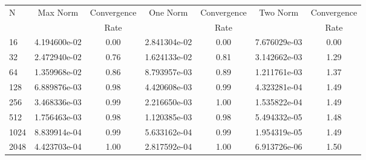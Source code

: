 \documentclass[12pt]{article}
\begin{document}
	\begin{tabular}{l|c|c|c|c|c|c}
		N&Max Norm&Convergence&One Norm&Convergence&Two Norm&Convergence\\
		&&Rate&&Rate&&Rate\\
		\hline
		16&4.194600e-02&0.00&2.841304e-02&0.00&7.676029e-03&0.00\\
		\hline
		32&2.472940e-02&0.76&1.624133e-02&0.81&3.142662e-03&1.29\\
		\hline
		64&1.359968e-02&0.86&8.793957e-03&0.89&1.211761e-03&1.37\\
		\hline
		128&6.889876e-03&0.98&4.420608e-03&0.99&4.323281e-04&1.49\\
		\hline
		256&3.468336e-03&0.99&2.216650e-03&1.00&1.535822e-04&1.49\\
		\hline
		512&1.756463e-03&0.98&1.120385e-03&0.98&5.494332e-05&1.48\\
		\hline
		1024&8.839914e-04&0.99&5.633162e-04&0.99&1.954319e-05&1.49\\
		\hline
		2048&4.423703e-04&1.00&2.817592e-04&1.00&6.913726e-06&1.50\\
	\end{tabular}
\end{document}
